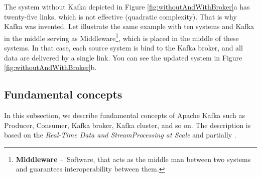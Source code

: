 The system without Kafka depicted in Figure \ref{fig:withoutAndWithBroker}a has twenty-five links, which is not effective (quadratic complexity). That is why Kafka was invented. Let illustrate the same example with ten systems and Kafka in the middle serving as Middleware\footnote{\textbf{Middleware} \---\ Software, that acts as the middle man between two systems and guarantees interoperability between them.}, which is placed in the middle of these systems. In that case, each source system is bind to the Kafka broker, and all data are delivered by a single link. You can see the updated system in Figure \ref{fig:withoutAndWithBroker}b.

\subsection{Fundamental concepts}

In this subsection, we describe fundamental concepts of Apache Kafka such as Producer, Consumer, Kafka broker, Kafka cluster, and so on. The description is based on the \emph{Real-Time Data and StreamProcessing at Scale} \cite{apacheKafkaDefinitiveGuide} and partially \cite{kafkaDocumentation}. 

